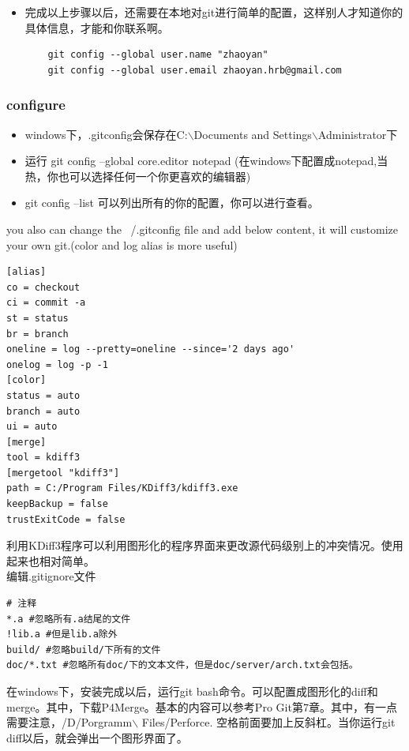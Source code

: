 \documentclass[a4paper,12pt,twoside]{book}
\begin{document}
\begin{CJK*}{UTF8}{song}
\begin{itemize}
    \item 完成以上步骤以后，还需要在本地对git进行简单的配置，这样别人才知道你的具体信息，才能和你联系啊。
    
    \begin{verbatim}
	git config --global user.name "zhaoyan"
	git config --global user.email zhaoyan.hrb@gmail.com
	\end{verbatim}
\end{itemize}

\subsubsection{configure}
    \begin{itemize}
    \item windows下，.gitconfig会保存在C:$\backslash$Documents and Settings$\backslash$Administrator下
    \item 运行 git config --global core.editor notepad (在windows下配置成notepad,当热，你也可以选择任何一个你更喜欢的编辑器)
    \item git config --list 可以列出所有的你的配置，你可以进行查看。
    \end{itemize}
    you also can change the ~/.gitconfig file and add below content, it will customize your own git.(color and log alias is more useful)

\begin{verbatim}
[alias]
co = checkout
ci = commit -a
st = status
br = branch
oneline = log --pretty=oneline --since='2 days ago'
onelog = log -p -1
[color]
status = auto
branch = auto
ui = auto
[merge]
tool = kdiff3
[mergetool "kdiff3"]
path = C:/Program Files/KDiff3/kdiff3.exe
keepBackup = false
trustExitCode = false	
\end{verbatim}
    利用KDiff3程序可以利用图形化的程序界面来更改源代码级别上的冲突情况。使用起来也相对简单。\\
编辑.gitignore文件
\begin{verbatim}
# 注释
*.a #忽略所有.a结尾的文件
!lib.a #但是lib.a除外
build/ #忽略build/下所有的文件
doc/*.txt #忽略所有doc/下的文本文件，但是doc/server/arch.txt会包括。
\end{verbatim}

在windows下，安装完成以后，运行git bash命令。可以配置成图形化的diff和merge。其中，下载P4Merge。基本的内容可以参考Pro Git第7章。其中，有一点需要注意，/D/Porgramm$\backslash$ Files/Perforce. 空格前面要加上反斜杠。当你运行git diff以后，就会弹出一个图形界面了。


\end{CJK*}
\end{document}
